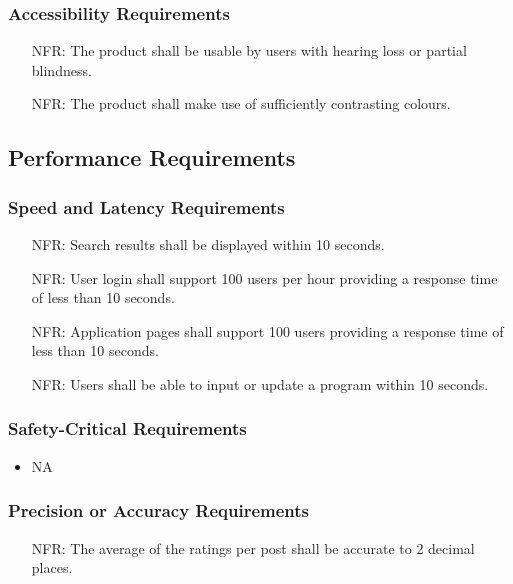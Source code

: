 \documentclass[12pt]{article}
\newcounter{nfrnum} %
\begin{document}
\subsubsection{Accessibility Requirements}
\noindent \begin{itemize}
	\item[NFR\refstepcounter{nfrnum}\thenfrnum:]
	The product shall be usable by users with hearing loss or partial blindness.
\end{itemize}
\noindent \begin{itemize}
	\item[NFR\refstepcounter{nfrnum}\thenfrnum:]
	The product shall make use of sufficiently contrasting colours.
\end{itemize}
\subsection{Performance Requirements}
  \subsubsection{Speed and Latency Requirements}
    \noident\begin{itemize}
      \item[NFR\refstepcounter{nfrnum}\thenfrnum:] 
        Search results shall be displayed within 10 seconds.
      \item[NFR\refstepcounter{nfrnum}\thenfrnum:] 
        User login shall support 100 users per hour providing a response time of less than 10 seconds.
      \item[NFR\refstepcounter{nfrnum}\thenfrnum:] 
        Application pages shall support 100 users providing a response time of less than 10 seconds.
      \item[NFR\refstepcounter{nfrnum}\thenfrnum:] 
        Users shall be able to input or update a program within 10 seconds.
    \end{itemize}
  \subsubsection{Safety-Critical Requirements}
    \noident\begin{itemize}
      \item NA
    \end{itemize}
  \subsubsection{Precision or Accuracy Requirements}
    \noident\begin{itemize}
      \item[NFR\refstepcounter{nfrnum}\thenfrnum:] 
        The average of the ratings per post shall be accurate to 2 decimal places.
    \end{itemize}
\end{document}

